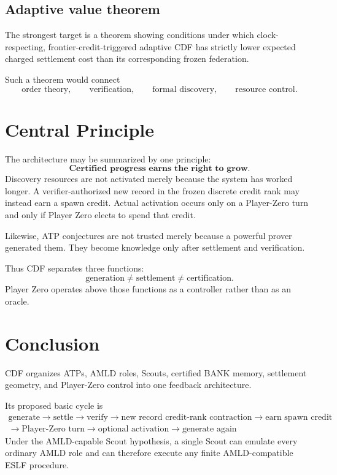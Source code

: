\documentclass[11pt]{article}
\theoremstyle{definition}
\begin{document}
\subsection{Adaptive value theorem}
The strongest target is a theorem showing conditions under which clock-respecting, frontier-credit-triggered adaptive CDF has strictly lower expected charged settlement cost than its corresponding frozen federation.

Such a theorem would connect
\[
\text{order theory},\qquad
\text{verification},\qquad
\text{formal discovery},\qquad
\text{resource control}.
\]

\section{Central Principle}

The architecture may be summarized by one principle:
\[
\boxed{\textbf{Certified progress earns the right to grow.}}
\]
Discovery resources are not activated merely because the system has worked longer. A verifier-authorized new record in the frozen discrete credit rank may instead earn a spawn credit. Actual activation occurs only on a Player-Zero turn and only if Player Zero elects to spend that credit.

Likewise, ATP conjectures are not trusted merely because a powerful prover generated them. They become knowledge only after settlement and verification.

Thus CDF separates three functions:
\[
\boxed{\text{generation}\neq\text{settlement}\neq\text{certification}.}
\]
Player Zero operates above those functions as a controller rather than as an oracle.

\section{Conclusion}

CDF organizes ATPs, AMLD roles, Scouts, certified BANK memory, settlement geometry, and Player-Zero control into one feedback architecture.

Its proposed basic cycle is
\[
\boxed{\begin{gathered}
\text{generate}\to\text{settle}\to\text{verify}\to\text{new record credit-rank contraction}\to\text{earn spawn credit}\\
\to\text{Player-Zero turn}\to\text{optional activation}\to\text{generate again}
\end{gathered}}
\]
Under the AMLD-capable Scout hypothesis, a single Scout can emulate every ordinary AMLD role and can therefore execute any finite AMLD-compatible ESLF procedure.
\end{document}

